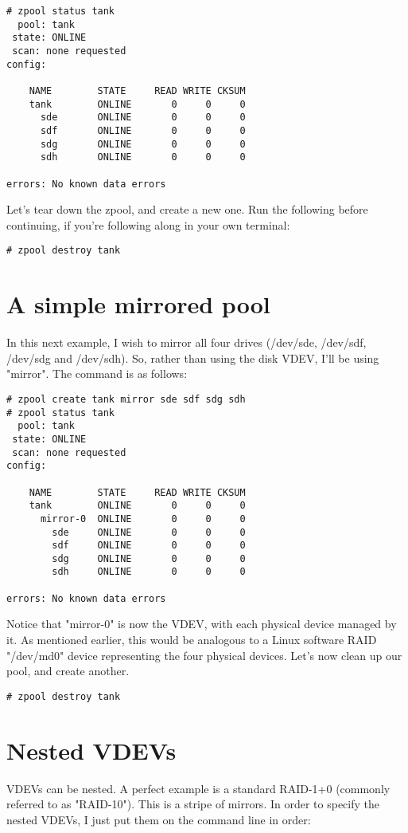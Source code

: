 \documentclass[landscape]{book}
\begin{document}
\begin{lstlisting}
# zpool status tank
  pool: tank
 state: ONLINE
 scan: none requested
config:

    NAME        STATE     READ WRITE CKSUM
    tank        ONLINE       0     0     0
      sde       ONLINE       0     0     0
      sdf       ONLINE       0     0     0
      sdg       ONLINE       0     0     0
      sdh       ONLINE       0     0     0

errors: No known data errors
\end{lstlisting}

Let's tear down the zpool, and create a new one. Run the following before
continuing, if you're following along in your own terminal:

\begin{lstlisting}
# zpool destroy tank
\end{lstlisting}

\section{A simple mirrored pool}
In this next example, I wish to mirror all four drives (/dev/sde, /dev/sdf,
/dev/sdg and /dev/sdh). So, rather than using the disk VDEV, I'll be using
"mirror". The command is as follows:

\begin{lstlisting}
# zpool create tank mirror sde sdf sdg sdh
# zpool status tank
  pool: tank
 state: ONLINE
 scan: none requested
config:

    NAME        STATE     READ WRITE CKSUM
    tank        ONLINE       0     0     0
      mirror-0  ONLINE       0     0     0
        sde     ONLINE       0     0     0
        sdf     ONLINE       0     0     0
        sdg     ONLINE       0     0     0
        sdh     ONLINE       0     0     0

errors: No known data errors
\end{lstlisting}

Notice that "mirror-0" is now the VDEV, with each physical device managed by
it. As mentioned earlier, this would be analogous to a Linux software RAID
"/dev/md0" device representing the four physical devices. Let's now clean up
our pool, and create another.

\begin{lstlisting}
# zpool destroy tank
\end{lstlisting}

\section{Nested VDEVs}
VDEVs can be nested. A perfect example is a standard RAID-1+0 (commonly
referred to as "RAID-10"). This is a stripe of mirrors. In order to specify the
nested VDEVs, I just put them on the command line in order:
\end{document}
